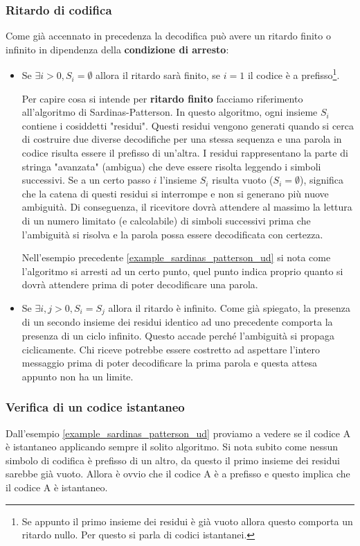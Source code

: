 \documentclass{article}
\theoremstyle{definition}
\numberwithin{equation}{section}
\begin{document}
\subsubsection{Ritardo di codifica}
Come già accennato in precedenza la decodifica può avere un ritardo finito o infinito in dipendenza della \textbf{condizione di arresto}:
\begin{itemize}
    \item Se $\exists i>0, S_i=\emptyset$ allora il ritardo sarà finito, se $i = 1$ il codice è a prefisso\footnote{Se appunto il primo insieme dei residui è già vuoto allora questo comporta un ritardo nullo. Per questo si parla di codici istantanei.}.

          Per capire cosa si intende per \textbf{ritardo finito} facciamo riferimento all'algoritmo di Sardinas-Patterson. In questo algoritmo, ogni insieme $S_i$ contiene i cosiddetti "residui". Questi residui vengono generati quando si cerca di costruire due diverse decodifiche per una stessa sequenza e una parola in codice risulta essere il prefisso di un'altra. I residui rappresentano la parte di stringa "avanzata" (ambigua) che deve essere risolta leggendo i simboli successivi. Se a un certo passo $i$ l'insieme $S_i$ risulta vuoto ($S_i=\emptyset$), significa che la catena di questi residui si interrompe e non si generano più nuove ambiguità. Di conseguenza, il ricevitore dovrà attendere al massimo la lettura di un numero limitato (e calcolabile) di simboli successivi prima che l'ambiguità si risolva e la parola possa essere decodificata con certezza.

          Nell'esempio precedente \eqref{example_sardinas_patterson_ud} si nota come l'algoritmo si arresti ad un certo punto, quel punto indica proprio quanto si dovrà attendere prima di poter decodificare una parola.
    \item Se $\exists i,j>0, S_i=S_j$ allora il ritardo è infinito. Come già spiegato, la presenza di un secondo insieme dei residui identico ad uno precedente comporta la presenza di un ciclo infinito. Questo accade perché l'ambiguità si propaga ciclicamente. Chi riceve potrebbe essere costretto ad aspettare l'intero messaggio prima di poter decodificare la prima parola e questa attesa appunto non ha un limite.
\end{itemize}
\subsubsection{Verifica di un codice istantaneo}
Dall'esempio \eqref{example_sardinas_patterson_ud} proviamo a vedere se il codice A è istantaneo applicando sempre il solito algoritmo. Si nota subito come nessun simbolo di codifica è prefisso di un altro, da questo il primo insieme dei residui sarebbe già vuoto. Allora è ovvio che il codice A è a prefisso e questo implica che il codice A è istantaneo.
\end{document}
